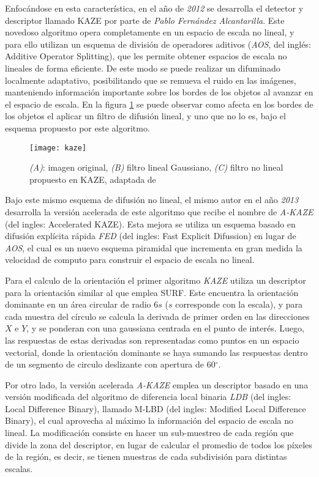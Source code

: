 Enfocándose en esta característica, en el año de \textit{2012} se desarrolla el detector y descriptor llamado KAZE \cite{kaze} por parte de \textit{Pablo Fernández Alcantarilla}. Este novedoso algoritmo opera completamente en un espacio de escala no lineal, y para ello utilizan un esquema de división de operadores aditivos (\textit{AOS}, del inglés: Additive Operator Splitting), que les permite obtener espacios de escala no lineales de forma eficiente. De este modo se puede realizar un difuminado localmente adaptativo, posibilitando que se remueva el ruido en las imágenes, manteniendo información importante sobre los bordes de los objetos al avanzar en el espacio de escala. En la figura \ref{imagen:kaze} se puede observar como afecta en los bordes de los objetos el aplicar un filtro de difusión lineal, y uno que no lo es, bajo el esquema propuesto por este algoritmo.

\begin{figure}[H]
	\centering
	\texttt{[image: kaze]}
	\caption[Filtro no lineal propuesto por KAZE]{\textit{(A)}: imagen original, \textit{(B)} filtro lineal Gaussiano, \textit{(C)} filtro no lineal propuesto en KAZE, adaptada de \cite{kaze}}
	\label{imagen:kaze}
\end{figure}

Bajo este mismo esquema de difusión no lineal, el mismo autor en el año \textit{2013} desarrolla la versión acelerada de este algoritmo que recibe el nombre de \textit{A-KAZE} \cite{akaze} (del ingles: Accelerated KAZE). Esta mejora se utiliza un esquema basado en difusión explícita rápida \textit{FED} (del ingles: Fast Explicit Difussion) en lugar de \textit{AOS}, el cual es un nuevo esquema piramidal que incrementa en gran medida la velocidad de computo para construir el espacio de escala no lineal.

Para el calculo de la orientación el primer algoritmo \textit{KAZE} utiliza un descriptor para la orientación similar al que emplea SURF. Este encuentra la orientación dominante en un área circular de radio 6$s$ ($s$ corresponde con la escala), y para cada muestra del círculo se calcula la derivada de primer orden en las direcciones $X$ e $Y$, y se ponderan con una gaussiana centrada en el punto de interés. Luego, las respuestas de estas derivadas son representadas como puntos en un espacio vectorial, donde la orientación dominante se haya sumando las respuestas dentro de un segmento de circulo deslizante con apertura de 60$^\circ$.

Por otro lado, la versión acelerada \textit{A-KAZE} emplea un descriptor basado en una versión modificada del algoritmo de diferencia local binaria \textit{LDB} \cite{ldb} (del ingles: Local Difference Binary), llamado M-LBD (del ingles: Modified Local Difference Binary), el cual aprovecha al máximo la información del espacio de escala no lineal. La modificación consiste en hacer un sub-muestreo de cada región que divide la zona del descriptor, en lugar de calcular el promedio de todos los píxeles de la región, es decir, se tienen muestras de cada subdivisión para distintas escalas.


